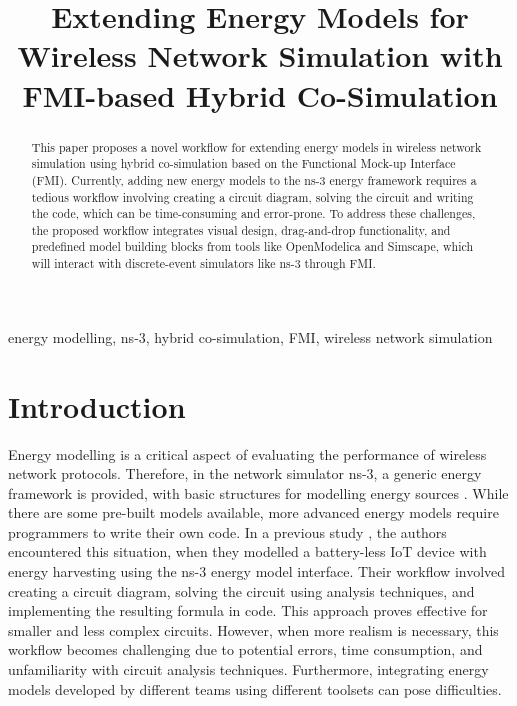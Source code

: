 \documentclass[conference]{IEEEtran}
\def\ns3{ns-3}
\begin{document}
\title{Extending Energy Models for Wireless Network Simulation with FMI-based Hybrid Co-Simulation}

\author{
}

\maketitle

\begin{abstract}
This paper proposes a novel workflow for extending energy models in wireless network simulation using hybrid co-simulation based on the Functional Mock-up Interface (FMI). Currently, adding new energy models to the \ns3 energy framework requires a tedious workflow involving creating a circuit diagram, solving the circuit and writing the code, which can be time-consuming and error-prone. To address these challenges, the proposed workflow integrates visual design, drag-and-drop functionality, and predefined model building blocks from tools like OpenModelica and Simscape, which will interact with discrete-event simulators like \ns3 through FMI.
\end{abstract}

\begin{IEEEkeywords}
energy modelling, \ns3, hybrid co-simulation, FMI, wireless network simulation 
\end{IEEEkeywords}

\section{Introduction}

Energy modelling is a critical aspect of evaluating the performance of wireless network protocols.
Therefore, in the network simulator \ns3, a generic energy framework is provided, with basic structures for modelling energy sources \cite{wu2012energy}.
While there are some pre-built models available, more advanced energy models require programmers to write their own code.
In a previous study \cite{capuzzo2021ns}, the authors encountered this situation, when they modelled a battery-less IoT device with energy harvesting using the \ns3 energy model interface.
Their workflow involved creating a circuit diagram, solving the circuit using analysis techniques, and implementing the resulting formula in code. 
This approach proves effective for smaller and less complex circuits.
However, when more realism is necessary, this workflow becomes challenging due to potential errors, time consumption, and unfamiliarity with circuit analysis techniques. Furthermore, integrating energy models developed by different teams using different toolsets can pose difficulties.
\end{document}
